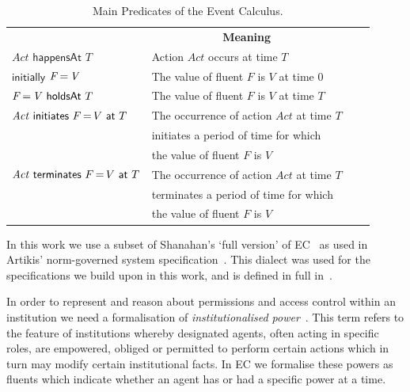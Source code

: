 \begin{table}[htbp]
\caption{Main Predicates  of the Event Calculus.}\label{table:ec}
\begin{center}
\renewcommand{\arraystretch}{0.9}
\setlength\tabcolsep{3pt}
\begin{tabular}{llcc}
\hline\noalign{\smallskip}
\multicolumn{1}{c}{\textbf{Predicate}} & \multicolumn{1}{c}{\textbf{Meaning}}  \\
\noalign{\smallskip}
\hline
\noalign{\smallskip}
$\mathit{Act} \,\, \mathsf{happensAt} \,\, T $ & Action $\mathit{Act}$ occurs at time $T$  \\[2pt]
$\mathsf{initially}$ $\mathit{F \operatorname{=} V}$ & The value of fluent $F$ is $V$ at time $0$  \\[2pt] 
$\mathit{F \operatorname{=} V} \,\, \mathsf{holdsAt} \,\, T$ & The value of fluent $F$ is $V$ at time $T$ 
\\[2pt] 
$\mathit{Act} \,\, \mathsf{initiates} \,\, F \operatorname{=} V \,\, \mathsf{at} \,\, T$ & The occurrence of action $\mathit{Act}$ at time $T$ \\ 
& initiates a period of time for which \\
& the value of fluent $F$ is $V$ \\[2pt] 
$\mathit{Act} \,\, \mathsf{terminates} \,\, F \operatorname{=} V \,\, \mathsf{at} \,\, T$ & The occurrence of action $\mathit{Act}$ at time $T$ \\
& terminates a period of time for which \\
& the value of fluent $F$ is $V$  \\
\hline
\end{tabular}
\end{center}
\end{table}

In this work we use a subset of Shanahan's `full version' of EC~\cite{Shanahan1999} as used in Artikis' norm-governed system specification~\cite{Artikis2009}. This dialect was used for the specifications we build upon in this work, and is defined in full in~\cite[p.35]{Artikis2003t}.

In order to represent and reason about permissions and access control within an institution we need a formalisation of \emph{institutionalised power}~\citep{Jones1996}. 
This term refers to the feature of institutions whereby designated agents, often acting in specific roles, are empowered, obliged or permitted to perform certain actions which in turn may modify certain institutional facts. 
In \ac{EC} we formalise these powers as fluents which indicate whether an agent has or had a specific power at a time.

